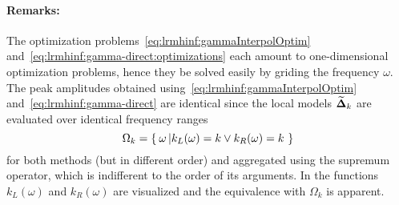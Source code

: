 \paragraph*{Remarks:}
The optimization problems~\eqref{eq:lrmhinf:gammaInterpolOptim} and~\eqref{eq:lrmhinf:gamma-direct:optimizations} each amount to one-dimensional optimization problems, hence they be solved easily by griding the frequency $\omega$.
The peak amplitudes obtained using~\eqref{eq:lrmhinf:gammaInterpolOptim} and~\eqref{eq:lrmhinf:gamma-direct} are identical since the local models $\widetilde{\mathbf{\Delta}}_k$ are evaluated over identical frequency ranges
 \begin{equation}
  \Omega_k = \Set{\omega \left| k_L(\omega) = k \vee k_R(\omega) = k \right.}
 \end{equation}
for both methods (but in different order) and aggregated using the supremum operator, which is indifferent to the order of its arguments.
In  the functions $k_L(\omega)$ and $k_R(\omega)$ are visualized and the equivalence with $\Omega_k$ is apparent.

